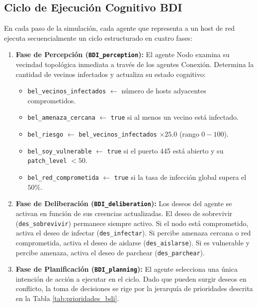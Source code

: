 \subsection{Ciclo de Ejecución Cognitivo BDI}
En cada paso de la simulación, cada agente que representa a un host de red ejecuta secuencialmente un ciclo estructurado en cuatro fases:
\begin{enumerate}
    \item \textbf{Fase de Percepción (\texttt{BDI\_}\allowbreak\texttt{perception}):} El agente Nodo examina su vecindad topológica inmediata a través de los agentes Conexión. Determina la cantidad de vecinos infectados y actualiza su estado cognitivo:
    \begin{itemize}
        \item \texttt{bel\_vecinos\_}\allowbreak\texttt{infectados} $\leftarrow$ número de hosts adyacentes comprometidos.
        \item \texttt{bel\_amenaza\_}\allowbreak\texttt{cercana} $\leftarrow$ \texttt{true} si al menos un vecino está infectado.
        \item \texttt{bel\_}\allowbreak\texttt{riesgo} $\leftarrow$ \texttt{bel\_vecinos\_}\allowbreak\texttt{infectados} $\times 25.0$ (rango $0-100$).
        \item \texttt{bel\_soy\_}\allowbreak\texttt{vulnerable} $\leftarrow$ \texttt{true} si el puerto 445 está abierto y su \texttt{patch\_}\allowbreak\texttt{level} $< 50$.
        \item \texttt{bel\_red\_}\allowbreak\texttt{comprometida} $\leftarrow$ \texttt{true} si la tasa de infección global supera el $50\%$.
    \end{itemize}
    \item \textbf{Fase de Deliberación (\texttt{BDI\_}\allowbreak\texttt{deliberation}):} Los deseos del agente se activan en función de sus creencias actualizadas. El deseo de sobrevivir (\texttt{des\_}\allowbreak\texttt{sobrevivir}) permanece siempre activo. Si el nodo está comprometido, activa el deseo de infectar (\texttt{des\_}\allowbreak\texttt{infectar}). Si percibe amenaza cercana o red comprometida, activa el deseo de aislarse (\texttt{des\_}\allowbreak\texttt{aislarse}). Si es vulnerable y percibe amenaza, activa el deseo de parchear (\texttt{des\_}\allowbreak\texttt{parchear}).
    \item \textbf{Fase de Planificación (\texttt{BDI\_}\allowbreak\texttt{planning}):} El agente selecciona una única intención de acción a ejecutar en el ciclo. Dado que pueden surgir deseos en conflicto, la toma de decisiones se rige por la jerarquía de prioridades descrita en la Tabla \ref{tab:prioridades_bdi}.

\end{enumerate}
